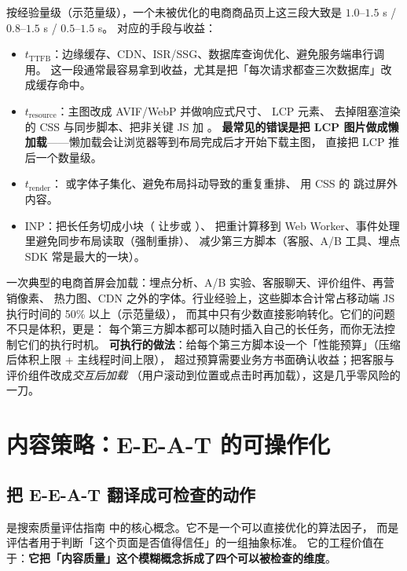 按经验量级（示范量级），一个未被优化的电商商品页上这三段大致是
$1.0\text{--}1.5$ s / $0.8\text{--}1.5$ s / $0.5\text{--}1.5$ s。
对应的手段与收益：

\begin{itemize}
  \item $t_{\text{TTFB}}$：边缘缓存、CDN、ISR/SSG、数据库查询优化、避免服务端串行调用。
        这一段通常最容易拿到收益，尤其是把「每次请求都查三次数据库」改成缓存命中。
  \item $t_{\text{resource}}$：主图改成 AVIF/WebP 并做响应式尺寸、 LCP 元素、
        去掉阻塞渲染的 CSS 与同步脚本、把非关键 JS 加 。
        \textbf{最常见的错误是把 LCP 图片做成懒加载}——懒加载会让浏览器等到布局完成后才开始下载主图，
        直接把 LCP 推后一个数量级。
  \item $t_{\text{render}}$： 或字体子集化、避免布局抖动导致的重复重排、
        用 CSS 的  跳过屏外内容。
  \item INP：把长任务切成小块（ 让步或 ）、
        把重计算移到 Web Worker、事件处理里避免同步布局读取（强制重排）、
        减少第三方脚本（客服、A/B 工具、埋点 SDK 常是最大的一块）。
\end{itemize}

\begin{insight}[第三方脚本是性能预算里最没有回报的一块支出]
一次典型的电商首屏会加载：埋点分析、A/B 实验、客服聊天、评价组件、再营销像素、
热力图、CDN 之外的字体。行业经验上，这些脚本合计常占移动端 JS 执行时间的 50\% 以上（示范量级），
而其中只有少数直接影响转化。它们的问题不只是体积，更是：
每个第三方脚本都可以随时插入自己的长任务，而你无法控制它们的执行时机。
\textbf{可执行的做法}：给每个第三方脚本设一个「性能预算」（压缩后体积上限 + 主线程时间上限），
超过预算需要业务方书面确认收益；把客服与评价组件改成\emph{交互后加载}
（用户滚动到位置或点击时再加载），这是几乎零风险的一刀。
\end{insight}

\section{内容策略：E-E-A-T 的可操作化}
\label{sec:seo-content}

\subsection{把 E-E-A-T 翻译成可检查的动作}

 是搜索质量评估指南
\cite{google2024quality} 中的核心概念。它不是一个可以直接优化的算法因子，
而是评估者用于判断「这个页面是否值得信任」的一组抽象标准。
它的工程价值在于：\textbf{它把「内容质量」这个模糊概念拆成了四个可以被检查的维度}。

